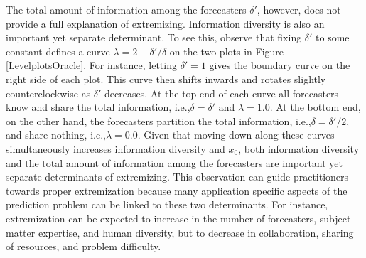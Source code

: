 \documentclass[11pt]{article}
\theoremstyle{definition}
\theoremstyle{definition}
\begin{document}
The total amount of information among the forecasters $\delta'$, however, does not provide a full
explanation of extremizing.  Information diversity is also an
important yet separate determinant.  To see this, observe that fixing $\delta'$ to
some constant defines a curve $\lambda = 2 - \delta'/\delta$ on the two plots in  Figure \ref{LevelplotsOracle}. For
instance, letting $\delta' = 1$ gives the boundary curve on the right
side of each plot.  This curve then shifts inwards and rotates slightly
counterclockwise as $\delta'$ decreases.  At the top end of each curve
all forecasters know and share the total information, i.e.,$\delta =
\delta'$ and $\lambda = 1.0$.  At the bottom end, on the other hand,
the forecasters partition the total information, i.e.,$\delta =
\delta'/2$, and share nothing, i.e.,$\lambda = 0.0$.  Given that
moving down along these curves simultaneously increases information diversity and
$x_0$, both information diversity and the total amount of
information among the forecasters are important yet separate determinants of  extremizing. This observation can guide practitioners towards proper extremization because  many  application specific aspects of the prediction problem can be linked to these two determinants. For instance, extremization can be
expected to increase in the number of forecasters,
subject-matter expertise, and human diversity, but to decrease in
collaboration, sharing of resources, and problem difficulty.

 
 
\end{document}
